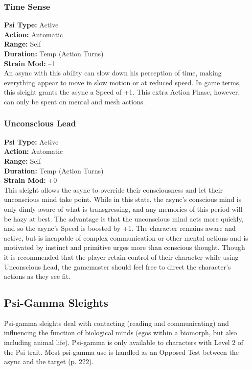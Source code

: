 \subsubsection{Time Sense}
\textbf{Psi Type:} Active \\ 
\textbf{Action:} Automatic \\ 
\textbf{Range:} Self \\ 
\textbf{Duration:} Temp (Action Turns) \\
\textbf{Strain Mod:} –1 \\
An async with this ability can slow down his perception
of time, making everything appear to move
in slow motion or at reduced speed. In game terms,
this sleight grants the async a Speed of +1. This extra
Action Phase, however, can only be spent on mental
and mesh actions.

\subsubsection{Unconscious Lead}
\textbf{Psi Type:} Active \\ 
\textbf{Action:} Automatic \\ 
\textbf{Range:} Self \\ 
\textbf{Duration:} Temp (Action Turns) \\
\textbf{Strain Mod:} +0 \\
This sleight allows the async to override their consciousness
and let their unconscious mind take point.
While in this state, the async’s conscious mind is only
dimly aware of what is transgressing, and any memories
of this period will be hazy at best. The advantage
is that the unconscious mind acts more quickly, and
so the async’s Speed is boosted by +1. The character
remains aware and active, but is incapable of complex
communication or other mental actions and is
motivated by instinct and primitive urges more than
conscious thought. Though it is recommended that
the player retain control of their character while using
Unconscious Lead, the gamemaster should feel free to
direct the character’s actions as they see fit.


\subsection{Psi-Gamma Sleights}
Psi-gamma sleights deal with contacting (reading
and communicating) and influencing the function of
biological minds (egos within a biomorph, but also
including animal life). Psi-gamma is only available to
characters with Level 2 of the Psi trait.
Most psi-gamma use is handled as an Opposed Test
between the async and the target (p. 222).

